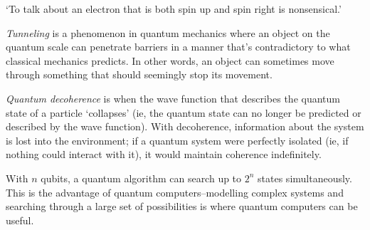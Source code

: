 `To talk about an electron that is both spin up and spin right is nonsensical.'

\begin{definition}
    \emph{Tunneling} is a phenomenon in quantum mechanics where an object on the quantum scale can penetrate barriers in a manner that's contradictory to what classical mechanics predicts. In other words, an object can sometimes move through something that should seemingly stop its movement.
\end{definition}

\begin{definition}
    \emph{Quantum decoherence} is when the wave function that describes the quantum state of a particle `collapses' (ie, the quantum state can no longer be predicted or described by the wave function). With decoherence, information about the system is lost into the environment; if a quantum system were perfectly isolated (ie, if nothing could interact with it), it would maintain coherence indefinitely.
\end{definition}

With $n$ qubits, a quantum algorithm can search up to $2^n$ states simultaneously. This is the advantage of quantum computers–modelling complex systems and searching through a large set of possibilities is where quantum computers can be useful.


